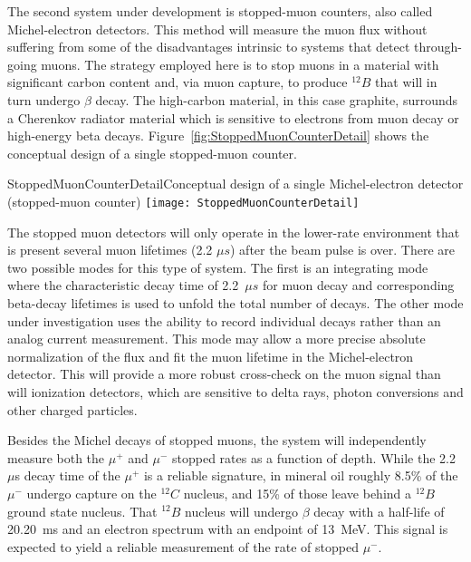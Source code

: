 The second system under development is stopped-muon counters, also called
Michel-electron detectors. This method will measure the muon flux without
suffering from some of the disadvantages intrinsic to systems that
detect through-going muons. The strategy employed here is to stop muons
in a material with significant carbon content 
and, via muon capture, to produce $^{12}B$ that will in turn undergo $\beta$ decay.
 The high-carbon material, in this case graphite, surrounds a Cherenkov radiator
material which is sensitive to electrons from muon decay or 
high-energy beta decays.  Figure~\ref{fig:StoppedMuonCounterDetail} 
shows the conceptual design of a single stopped-muon counter. 


\begin{cdrfigure}{StoppedMuonCounterDetail}{Conceptual design of a single Michel-electron detector (stopped-muon counter)}
\texttt{[image: StoppedMuonCounterDetail]}
\end{cdrfigure}

The stopped muon detectors will only operate in the lower-rate
environment that is present several muon lifetimes (2.2 $\mu s$) after the beam pulse is
over. There are two possible modes for this type of system. 
The first is an integrating mode where the characteristic decay time of 
2.2~$\mu s$ for muon decay and corresponding beta-decay lifetimes is used to
unfold the total number of decays. The other mode under
investigation uses the ability to record individual decays rather
than an analog current measurement. This mode may allow a more precise absolute
normalization of the flux and fit the muon lifetime in the Michel-electron detector. 
This will provide a more robust cross-check on the
muon signal than will ionization detectors, which are sensitive to delta
rays, photon conversions and other charged particles.

Besides the Michel decays of stopped muons, the system will
independently measure both the $\mu ^{+}$ and $\mu ^{-}$ stopped
rates as a function of depth. 
While the 2.2~$\mu $s decay time of the $\mu^+$ is a reliable
signature, in mineral oil roughly 8.5\% of the $\mu^{-}$ undergo capture
on the $^{12}C$ nucleus, and 15\% of those leave behind a $^{12}B$
ground state nucleus. That $^{12}B$ nucleus will undergo $\beta$ decay
with a half-life of 20.20~ms and an electron spectrum with an endpoint
of 13~MeV. This signal is expected to yield a reliable measurement of the rate of stopped
$\mu^{-}$.

